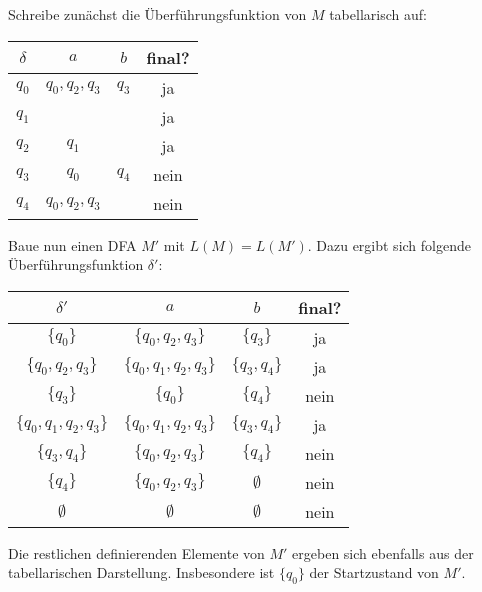 
Schreibe zunächst die Überführungsfunktion von $M$ tabellarisch auf:

\begin{center}
\begin{tabular}{|c|c|c|c|}
	\hline
	$\delta$ & $a$ & $b$ & final? \\
	\hline
	$q_0$ & $q_0,q_2,q_3$ & $q_3$ & ja \\
	\hline
	$q_1$ & & & ja \\
	\hline
	$q_2$ & $q_1$ & & ja \\
	\hline
	$q_3$ & $q_0$ & $q_4$ & nein \\
	\hline
	$q_4$ & $q_0,q_2,q_3$ & & nein \\
	\hline
\end{tabular}
\end{center}

Baue nun einen DFA $M'$ mit $L(M) = L(M')$. Dazu ergibt sich folgende
Überführungsfunktion $\delta'$:

\begin{center}
\begin{tabular}{|c|c|c|c|}
	\hline
	$\delta'$ & $a$ & $b$ & final? \\
	\hline
	$\{q_0\}$ & $\{q_0,q_2,q_3\}$ & $\{q_3\}$ & ja \\
	\hline
	$\{q_0,q_2,q_3\}$ & $\{q_0,q_1,q_2,q_3\}$ & $\{q_3,q_4\}$ & ja \\
	\hline
	$\{q_3\}$ & $\{q_0\}$ & $\{q_4\}$ & nein \\
	\hline
	$\{q_0,q_1,q_2,q_3\}$ & $\{q_0,q_1,q_2,q_3\}$ & $\{q_3,q_4\}$ & ja \\
	\hline
	$\{q_3,q_4\}$ & $\{q_0,q_2,q_3\}$ & $\{q_4\}$ & nein \\
	\hline
	$\{q_4\}$ & $\{q_0,q_2,q_3\}$ & $\emptyset$ & nein \\
	\hline
	$\emptyset$ & $\emptyset$ & $\emptyset$ & nein \\
	\hline
\end{tabular}
\end{center}

Die restlichen definierenden Elemente von $M'$ ergeben sich ebenfalls aus der
tabellarischen Darstellung. Insbesondere ist $\{q_0\}$ der Startzustand von
$M'$.
